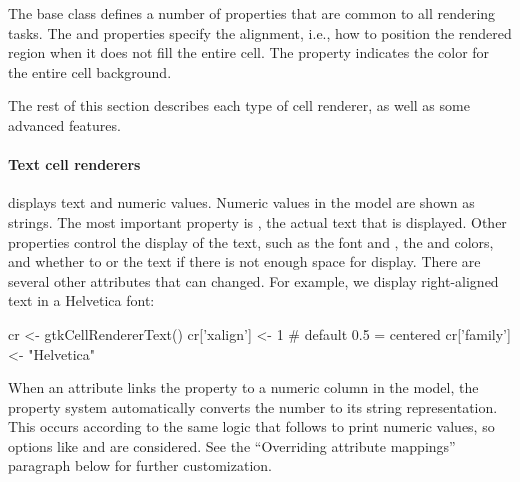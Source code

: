 The base class  defines a number of properties
that are common to all rendering tasks. The  and
 properties specify the alignment, i.e., how to position
the rendered region when it does not fill the entire cell. The
 property indicates the color for the entire
cell background.

The rest of this section describes each type of cell renderer, as well
as some advanced features.

\paragraph{Text cell renderers}

 displays text and numeric
values. Numeric values in the model are shown as strings.  The most
important property is , the actual text that is
displayed. Other properties control the display of the text, such as
the font  and , the  and
 colors, and whether to  or
 the text if there is not enough space for display. There
are several other attributes that can changed.  For example, we
display right-aligned text in a Helvetica font:
\begin{Schunk}
\begin{Sinput}
 cr <- gtkCellRendererText()
 cr['xalign'] <- 1                    # default 0.5 = centered
 cr['family'] <- "Helvetica"  
\end{Sinput}
\end{Schunk}

When an attribute links the  property to a numeric column
in the model, the property system automatically converts the number to
its string representation. This occurs according to the same logic
that \R\/ follows to print numeric values, so options like
 and  are considered. See the ``Overriding
attribute mappings'' paragraph below for further customization.

